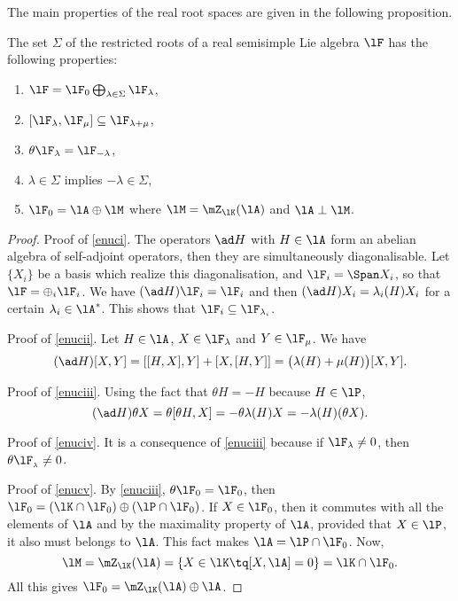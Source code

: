 The main properties of the real root spaces are given in the following proposition.

\begin{proposition}     \label{PropPropRacincesReelles}
The set $\Sigma$ of the restricted roots of a real semisimple Lie algebra $\lF$ has the following properties:
\label{prop:enuc}
\begin{enumerate}
\item\label{enuci} $\lF=\lF_0\bigoplus_{\lambda\in\Sigma}\lF_{\lambda}$,
\item\label{enucii} $[\lF_{\lambda},\lF_{\mu}]\subseteq\lF_{\lambda+\mu}$,
\item\label{enuciii} $\theta\lF_{\lambda}=\lF_{-\lambda}$,
\item\label{enuciv} $\lambda\in\Sigma$ implies $-\lambda\in\Sigma$,
\item\label{enucv} $\lF_0=\lA\oplus\lM$ where $\lM=\mZ_{\lK}(\lA)$ and $\lA\perp\lM$.
\end{enumerate}
\end{proposition}

\begin{proof}
Proof of \ref{enuci}. The operators $\ad H$ with $H\in\lA$ form an abelian algebra of self-adjoint operators, then they are simultaneously diagonalisable. Let $\{X_i\}$ be a basis which realize this diagonalisation, and $\lF_i=\Span X_i$, so that $\lF=\oplus_i\lF_i$. We have $(\ad H)\lF_i=\lF_i$ and then $(\ad H)X_i=\lambda_i(H)X_i$ for a certain $\lambda_i\in\lA^*$. This shows that $\lF_i\subseteq\lF_{\lambda_i}$.

Proof of \ref{enucii}. Let $H\in\lA$, $X\in\lF_{\lambda}$ and $Y\in\lF_{\mu}$. We have
\begin{equation}
   (\ad H)[X,Y]=[[H,X],Y]+[X,[H,Y]]
               =\big(  \lambda(H)+\mu(H) \big) [X,Y].
\end{equation}

Proof of \ref{enuciii}. Using the fact that $\theta H=-H$ because $H\in\lP$,
\begin{equation}
  (\ad H)\theta X=\theta[\theta H,X]
                 =-\theta\lambda(H)X
         =-\lambda(H)(\theta X).
\end{equation}

Proof of \ref{enuciv}. It is a consequence of \ref{enuciii} because if $\lF_{\lambda}\neq 0$, then $\theta\lF_{_{\lambda}}\neq 0$.

Proof of \ref{enucv}. By \ref{enuciii}, $\theta\lF_0=\lF_0$, then $\lF_0=(\lK\cap\lF_0)\oplus(\lP\cap\lF_0)$. If $X\in\lF_0$, then it commutes with all the elements of $\lA$ and by the maximality property of $\lA$, provided that $X\in\lP$, it also must belongs to $\lA$. This fact makes $\lA=\lP\cap\lF_0$. Now,
\[
  \lM=\mZ_{\lK}(\lA)=\{X\in\lK\tq [X,\lA]=0\}=\lK\cap\lF_0.
\]
All this gives $\lF_0=\mZ_{\lK}(\lA)\oplus\lA$.
\end{proof}

